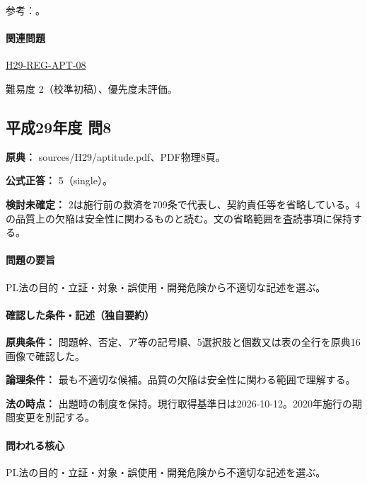 \par 参考：\cite{pl_statute,pl_qa,pl_definitions2018}。

\paragraph{関連問題} \hyperref[q:h29-reg-apt-08]{H29-REG-APT-08}

\par 難易度 2（校準初稿）、優先度未評価。

\subsection{平成29年度 問8}
\label{q:h29-reg-apt-08}

\noindent\textbf{原典：} sources/H29/aptitude.pdf、PDF物理8頁。

\textbf{公式正答：} 5（single）。

\par\textbf{検討未確定：} 2は施行前の救済を709条で代表し、契約責任等を省略している。4の品質上の欠陥は安全性に関わるものと読む。文の省略範囲を査読事項に保持する。

\paragraph{問題の要旨} PL法の目的・立証・対象・誤使用・開発危険から不適切な記述を選ぶ。

\paragraph{確認した条件・記述（独自要約）}\mbox{}\par

\noindent\textbf{原典条件：} 問題幹、否定、ア等の記号順、5選択肢と個数又は表の全行を原典16画像で確認した。\par

\noindent\textbf{論理条件：} 最も不適切な候補。品質の欠陥は安全性に関わる範囲で理解する。\par

\noindent\textbf{法の時点：} 出題時の制度を保持。現行取得基準日は2026-10-12。2020年施行の期間変更を別記する。\par

\paragraph{問われる核心} PL法の目的・立証・対象・誤使用・開発危険から不適切な記述を選ぶ。

